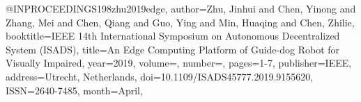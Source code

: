 @INPROCEEDINGS{198zhu2019edge,
author={Zhu, Jinhui and Chen, Yinong and Zhang, Mei and Chen, Qiang and Guo, Ying and Min, Huaqing and Chen, Zhilie},
booktitle={IEEE 14th International Symposium on Autonomous Decentralized System (ISADS)}, 
title={An Edge Computing Platform of Guide-dog Robot for Visually Impaired}, 
year={2019},
volume={},
number={},
pages={1-7},
publisher={IEEE},
address={Utrecht, Netherlands},
doi={10.1109/ISADS45777.2019.9155620},
ISSN={2640-7485},
month={April},}